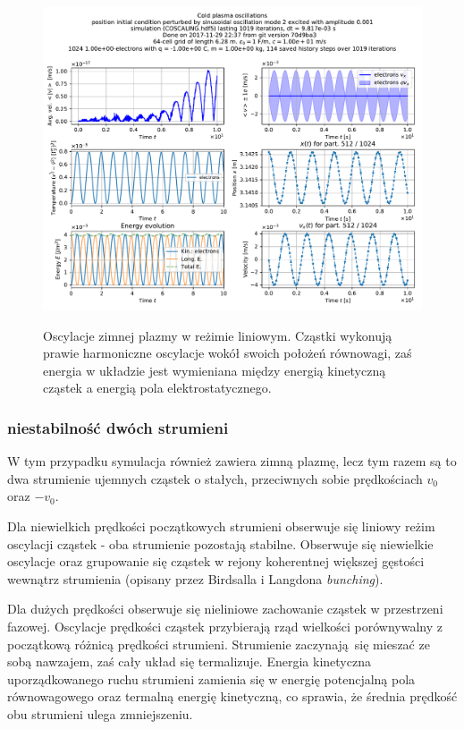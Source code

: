 \begin{figure}[h!]
  \includegraphics[width=\textwidth]{Images/COSCALING}
  \label{fig:coldplasma-linear}
  \caption{Oscylacje zimnej plazmy w reżimie liniowym. Cząstki wykonują prawie harmoniczne oscylacje wokół swoich położeń równowagi, zaś energia
    w układzie jest wymieniana między energią kinetyczną cząstek a energią pola elektrostatycznego.}
\end{figure}

    \subsubsection{niestabilność dwóch strumieni}
W tym przypadku symulacja również zawiera zimną plazmę, lecz tym razem są to dwa strumienie ujemnych cząstek
o stałych, przeciwnych sobie prędkościach $v_0$ oraz $-v_0$.

    Dla niewielkich prędkości początkowych strumieni obserwuje się
    liniowy reżim oscylacji cząstek - oba strumienie pozostają stabilne. Obserwuje się niewielkie oscylacje oraz
grupowanie się cząstek w rejony koherentnej większej gęstości wewnątrz strumienia (opisany przez Birdsalla i Langdona \emph{bunching}).

    Dla dużych prędkości obserwuje się nieliniowe
    zachowanie cząstek w przestrzeni fazowej. Oscylacje prędkości cząstek przybierają rząd wielkości porównywalny
    z początkową różnicą prędkości strumieni.
 Strumienie zaczynają się mieszać ze sobą nawzajem, zaś cały układ się termalizuje. Energia kinetyczna
 uporządkowanego ruchu strumieni zamienia się w energię potencjalną pola równowagowego 
oraz termalną energię kinetyczną, co sprawia, że średnia prędkość obu strumieni ulega zmniejszeniu. 

